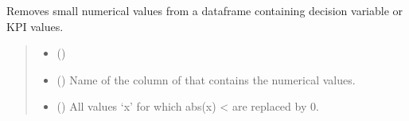 \documentclass[letterpaper,10pt,english]{sphinxmanual}
\begin{document}
\begin{fulllineitems}
\begin{fulllineitems}
\begin{quote}
\begin{description}
\begin{itemize}
\begin{itemize}
\end{itemize}


\end{itemize}

\end{description}\end{quote}

\end{fulllineitems}


\begin{fulllineitems}
\label{\detokenize{generated/tamos.data_IO.ResultsBatch:tamos.data_IO.ResultsBatch.remove_small_values}}
\pysigstartsignatures
{}
\pysigstopsignatures
\sphinxAtStartPar
Removes small numerical values from a dataframe containing decision variable or KPI values.
\begin{quote}\begin{description}
\begin{itemize}
\item {} 
\sphinxAtStartPar
{} () \textendash{} 

\item {} 
\sphinxAtStartPar
{} () \textendash{} Name of the column of  that contains the numerical values.

\item {} 
\sphinxAtStartPar
{} (\sphinxstyleliteralemphasis{\sphinxupquote{, }}\sphinxstyleliteralemphasis{\sphinxupquote{, }}) \textendash{} All values ‘x’ for which abs(x) \textless{}  are replaced by 0.


\end{itemize}
\end{description}
\end{quote}
\end{fulllineitems}
\end{fulllineitems}
\end{document}
